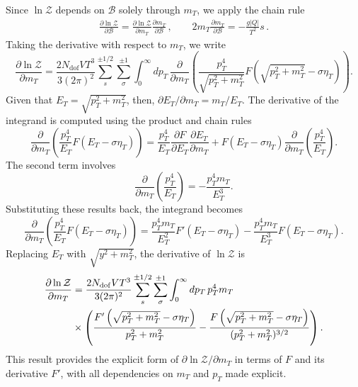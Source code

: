 \documentclass[epjST]{svjour}
\numberwithin{equation}{section}
\begin{document}
Since \(\ln\mathcal{Z}\) depends on \(\mathcal{B}\) solely through \(m_{T}\), we apply the chain rule
\begin{align}
    \label{eq:chain_rule}
    \frac{\partial \ln\mathcal{Z}}{\partial \mathcal{B}} = \frac{\partial \ln\mathcal{Z}}{\partial m_{T}} \frac{\partial m_{T}}{\partial \mathcal{B}}\,,\qquad
    2m_{T}\frac{\partial m_{T}}{\partial \mathcal{B}} = -\frac{g|Q|}{T^2}s\,.
\end{align}
Taking the derivative with respect to \(m_{T}\), we write
\begin{equation}
\frac{\partial \ln \mathcal{Z}}{\partial m_{T}} = \frac{2 N_{\mathrm{dof}} V T^{3}}{3 (2\pi)^{2}} \sum_{s}^{\pm1/2}\sum_{\sigma}^{\pm1} \int_{0}^{\infty} dp_{T} \, \frac{\partial}{\partial m_{T}} \left( \frac{p_{T}^{4}}{\sqrt{p_{T}^{2} + m_{T}^{2}}} F\left(\sqrt{p_{T}^{2} + m_{T}^{2}} - \sigma \eta_{T} \right) \right).
\end{equation}
Given that \(E_{T} = \sqrt{p_{T}^{2} + m_{T}^{2}}\), then, \(\partial E_{T} / \partial m_{T} = m_{T} / E_{T}\). The derivative of the integrand is computed using the product and chain rules
\begin{equation}
\frac{\partial}{\partial m_{T}} \left( \frac{p_{T}^{4}}{E_{T}} F(E_{T} - \sigma\eta_{T}) \right) = \frac{p_{T}^{4}}{E_{T}} \frac{\partial F}{\partial E_{T}} \frac{\partial E_{T}}{\partial m_{T}} + F(E_{T} - \sigma\eta_{T}) \frac{\partial}{\partial m_{T}} \left( \frac{p_{T}^{4}}{E_{T}} \right).
\end{equation}
The second term involves
\begin{equation}
\frac{\partial}{\partial m_{T}} \left( \frac{p_{T}^{4}}{E_{T}} \right) = -\frac{p_{T}^{4} m_{T}}{E_{T}^{3}}.
\end{equation}
Substituting these results back, the integrand becomes
\begin{equation}
\frac{\partial}{\partial m_{T}} \left( \frac{p_{T}^{4}}{E_{T}} F(E_{T} - \sigma\eta_{T}) \right) = \frac{p_{T}^{4} m_{T}}{E_{T}^{2}} F'(E_{T} - \sigma\eta_{T}) - \frac{p_{T}^{4} m_{T}}{E_{T}^{3}} F(E_{T} - \sigma\eta_{T}).
\end{equation}
Replacing \(E_{T}\) with \(\sqrt{y^{2} + m_{T}^{2}}\), the derivative of \(\ln \mathcal{Z}\) is
\begin{align}
    \notag
    \frac{\partial \ln \mathcal{Z}}{\partial m_{T}} &= \frac{2 N_{\mathrm{dof}} V T^{3}}{3 (2\pi)^{2}} \sum_{s}^{\pm1/2}\sum_{\sigma}^{\pm1} \int_{0}^{\infty} dp_{T} \, p_{T}^{4} m_{T}\\
    &\times\left( \frac{F'\left( \sqrt{p_{T}^{2} + m_{T}^{2}} - \sigma\eta_{T} \right)}{p_{T}^{2} + m_{T}^{2}} - \frac{F\left( \sqrt{p_{T}^{2} + m_{T}^{2}} - \sigma\eta_{T} \right)}{(p_{T}^{2} + m_{T}^{2})^{3/2}} \right).
\end{align}
This result provides the explicit form of \(\partial \ln \mathcal{Z}/\partial m_{T}\) in terms of \(F\) and its derivative \(F'\), with all dependencies on \(m_{T}\) and \(p_{T}\) made explicit.
\end{document}
